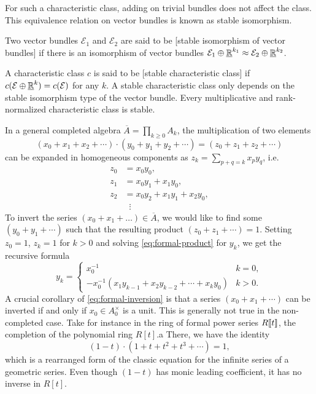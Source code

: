 For such a characteristic class, adding on trivial bundles does not affect the class. This equivalence relation on vector bundles is known as stable isomorphism.

\begin{definition}\label{def:stable-isomorphism}
	Two vector bundles $\mathcal{E}_1$ and $\mathcal{E}_2$ are said to be [stable isomorphism of vector bundles] if there is an isomorphism of vector bundles $\mathcal{E}_1\oplus \underline{\mathbb{R}}^{k_1} \approx \mathcal{E}_2\oplus \underline{\mathbb{R}}^{k_2}$.
\end{definition}

\begin{definition}
	A characteristic class $c$ is said to be [stable characteristic class] if $c(\mathcal{E}\oplus \underline{\mathbb{R}}^k) = c(\mathcal{E})$ for any $k$. A stable characteristic class only depends on the stable isomorphism type of the vector bundle. Every multiplicative and rank-normalized characteristic class is stable.
\end{definition}

In a general completed algebra $\overline{A}=\prod_{k\geq 0}A_k$, the multiplication of two elements
\[
	(x_0+x_1+x_2+\cdots)\cdot (y_0+y_1+y_2+\cdots) = (z_0 + z_1 + z_2+\cdots)
\]
can be expanded in homogeneous components as $z_k=\sum_{p+q=k} x_py_q$, i.e.
\begin{equation}\label{eq:formal-product}
	\begin{aligned}
		z_0 & = x_0y_0,                 \\
		z_1 & = x_0y_1 + x_1y_0,        \\
		z_2 & = x_0y_2 + x_1y_1+x_2y_0, \\
		    & \;\;\vdots
	\end{aligned}
\end{equation}
To invert the series $(x_0+ x_1+\ldots)\in \overline{A}$, we would like to find some $(y_0+y_1+\cdots)$ such that the resulting product $(z_0+z_1+\cdots)=1$. Setting $z_0=1$, $z_k=1$ for $k>0$ and solving \cref{eq:formal-product} for $y_k$, we get the recursive formula
\begin{equation}\label{eq:formal-inversion}
	y_k = \begin{cases}x_0^{-1}                                        & k=0,   \\
             -x_0^{-1}(x_1y_{k-1}+x_2y_{k-2}+\cdots +x_ky_0) & k > 0.
	\end{cases}
\end{equation}
A crucial corollary of \cref{eq:formal-inversion} is that a series $(x_0+x_1+\cdots)$ can be inverted if and only if $x_0\in A_0^\times$ is a unit. This is generally not true in the non-completed case. Take for instance in the ring of formal power series $R[\![t]\!]$, the completion of the polynomial ring $R[t]$.a There, we have the identity
\[
	(1-t)\cdot (1+t+t^2+t^3+\cdots) = 1,
\]
which is a rearranged form of the classic equation for the infinite series of a geometric series. Even though $(1-t)$ has monic leading coefficient, it has no inverse in $R[t]$.

